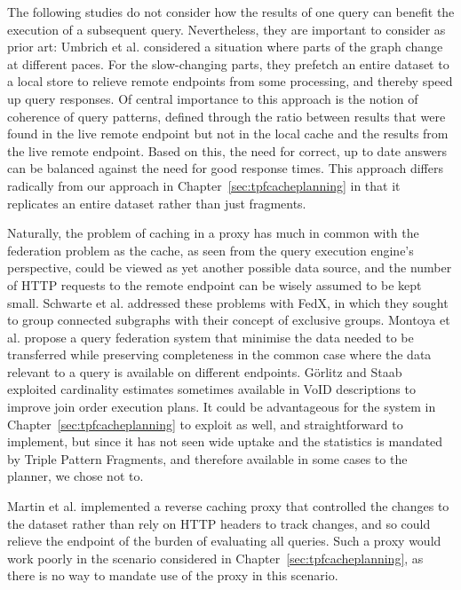 The following studies do not consider how the results of one query can
benefit the execution of a subsequent query. Nevertheless, they are
important to consider as prior art:
Umbrich et al. \cite{umbrich2012hybrid} considered a situation where
parts of the graph change at different paces. For the slow-changing
parts, they prefetch an entire dataset to a local store to relieve
remote endpoints from some processing, and thereby speed up query
responses. Of central importance to this approach is the notion of
coherence of query patterns, defined through the ratio between results
that were found in the live remote endpoint but not in the local cache
and the results from the live remote endpoint. Based on this, the need
for correct, up to date answers can be balanced against the need for
good response times.  This approach differs radically from our
approach in Chapter~\ref{sec:tpfcacheplanning} in that it replicates
an entire dataset rather than just fragments.

Naturally, the problem of caching in a proxy has much in common with
the federation problem as the cache, as seen from the query execution
engine's perspective, could be viewed as yet another possible data
source, and the number of HTTP requests to the remote endpoint can be
wisely assumed to be kept small. Schwarte et
al. \cite{springerlink:10.1007/978-3-642-25073-6-38} addressed these
problems with FedX, in which they sought to group connected subgraphs
with their concept of exclusive groups.  Montoya et
al. \cite{montoya2015federated} propose a query federation system that
minimise the data needed to be transferred while preserving
completeness in the common case where the data relevant to a query is
available on different endpoints. Görlitz and Staab \cite{splendid}
exploited cardinality estimates sometimes available in VoID
\cite{voidnote} descriptions to improve join order execution plans. It
could be advantageous for the system in
Chapter~\ref{sec:tpfcacheplanning} to exploit as well, and
straightforward to implement, but since it has not seen wide uptake
and the statistics is mandated by Triple Pattern Fragments, and
therefore available in some cases to the planner, we chose not to.

Martin et al. \cite{sparqlproxy} implemented a reverse caching proxy
that controlled the changes to the dataset rather than rely on HTTP
headers to track changes, and so could relieve the endpoint of the
burden of evaluating all queries. Such a proxy would work poorly in
the scenario considered in Chapter~\ref{sec:tpfcacheplanning}, as
there is no way to mandate use of the proxy in this scenario.

